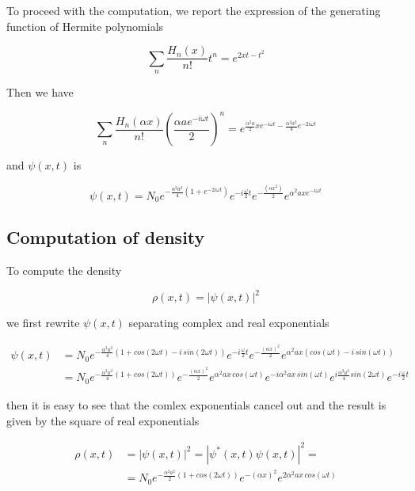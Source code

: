 \documentclass{article}
\begin{document}
To proceed with the computation, we report the expression of the generating function of Hermite polynomials

\begin{equation}
\sum_n \frac{H_n(x)}{n!} t^n = e^{2xt-t^2}
\end{equation}

Then we have

\[
\sum_n \frac{H_n(\alpha x)}{n!} \left( \frac{\alpha a e^{-i\omega t}}{2} \right)^n = e^{\frac{\alpha^2 a}{2} x e^{-i \omega t} - \frac{\alpha^2 a^2}{4}e^{-2i \omega t}}
\]

and \( \psi(x,t) \) is

\begin{equation}
\psi(x,t) = N_0 e^{-\frac{\alpha^2 a^2}{4}\left( 1 + e^{-2i \omega t} \right)} e^{-i \frac{\omega}{2} t} e^{-\frac{(\alpha x^2)}{2}} e^{\alpha^2 a x e^{-i \omega t}}
\end{equation}

\subsection{Computation of density}
To compute the density

\begin{equation}
\rho(x,t) = |\psi(x,t)|^2
\end{equation}

we first rewrite \( \psi(x,t) \) separating complex and real exponentials

\begin{align}
\psi(x,t) & = N_0 e^{-\frac{\alpha^2 a^2}{4}\left(1 + cos(2\omega t) - i \, sin(2 \omega t) \right)} e^{-i \frac{\omega}{2} t} e^{-\frac{(\alpha x)^2}{2}} e^{\alpha^2 a x (cos(\omega t) - i \, sin(\omega t))} \nonumber \\
& = N_0 e^{-\frac{\alpha^2 a^2}{4}\left(1 + cos(2\omega t) \right)} e^{-\frac{(\alpha x)^2}{2}} e^{\alpha^2 a x \, cos(\omega t)} e^{-i \alpha^2 a x \, sin(\omega t)} e^{i \frac{\alpha^2 a^2}{4}sin(2\omega t)} e^{-i \frac{\omega}{2} t}
\end{align}

then it is easy to see that the comlex exponentials cancel out and the result is given by the square of real exponentials

\begin{align}
\rho(x,t) & = |\psi(x,t)|^2 = |\psi^*(x,t) \psi(x,t)|^2 = \nonumber \\
& = N_0 e^{-\frac{\alpha^2 a^2}{2}\left(1 + cos(2\omega t) \right)} e^{-(\alpha x)^2} e^{2 \alpha^2 a x \, cos(\omega t)}
\end{align}
\end{document}
